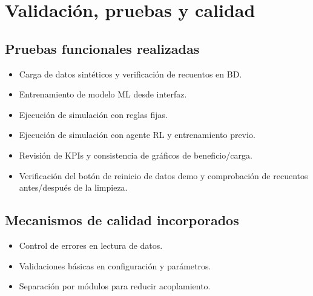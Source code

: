 \documentclass[12pt,a4paper]{article}
\begin{document}
\section{Validaci\'on, pruebas y calidad}
\subsection{Pruebas funcionales realizadas}
\begin{itemize}
    \item Carga de datos sint\'eticos y verificaci\'on de recuentos en BD.
    \item Entrenamiento de modelo ML desde interfaz.
    \item Ejecuci\'on de simulaci\'on con reglas fijas.
    \item Ejecuci\'on de simulaci\'on con agente RL y entrenamiento previo.
    \item Revisi\'on de KPIs y consistencia de gr\'aficos de beneficio/carga.
    \item Verificaci\'on del bot\'on de reinicio de datos demo y comprobaci\'on de recuentos antes/despu\'es de la limpieza.
\end{itemize}

\subsection{Mecanismos de calidad incorporados}
\begin{itemize}
    \item Control de errores en lectura de datos.
    \item Validaciones b\'asicas en configuraci\'on y par\'ametros.
    \item Separaci\'on por m\'odulos para reducir acoplamiento.
\end{itemize}
\end{document}

